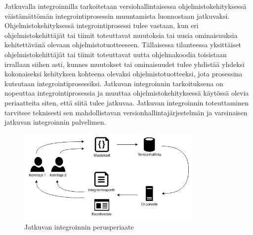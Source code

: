   Jatkuvalla integroinnilla tarkoitetaan versiohallintaisessa ohjelmistokehityksessä väistämättömän integrointiprosessin muuntamista luonnostaan jatkuvaksi.
  Ohjelmistokehityksessä integrointiprosessi tulee vastaan, kun eri ohjelmistokehittäjät tai tiimit toteuttavat muutoksia tai uusia ominaisuuksia kehitettävänä olevaan ohjelmistotuotteeseen.
  Tällaisessa tilanteessa yksittäiset ohjelmistokehittäjät tai tiimit toteuttavat uutta ohjelmakoodia toisistaan irrallaan siihen asti, kunnes muutokset tai ominaisuudet tulee yhdistää yhdeksi kokonaiseksi kehityksen kohteena olevaksi ohjelmistotuotteeksi, jota prosessina kutsutaan integrointiprosessiksi.
  Jatkuvan integroinnin tarkoituksena on nopeuttaa integrointiprosessia ja muuttaa ohjelmistokehityksessä käytössä olevia periaatteita siten, että siitä tulee jatkuvaa.
  Jatkuvan integroinnin toteuttaminen tarvitsee teknisesti sen mahdollistavan versionhallintajärjestelmän ja varsinaisen jatkuvan integroinnin palvelimen.

  \begin{figure}[H]
    \centering
    \includegraphics[width=0.8\textwidth]{assets/jatkuva-integrointi.png}
    \caption{Jatkuvan integroinnin perusperiaate}
    \label{fig:jatkuva-integrointi}
  \end{figure}

